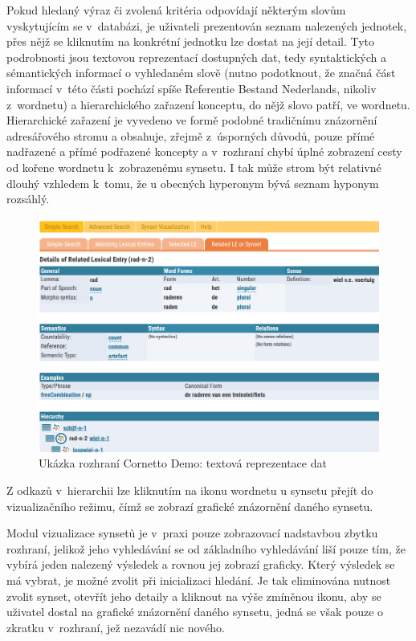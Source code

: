 \documentclass[a4paper, 11pt, oneside, showtrims]{book}
\begin{document}
					Pokud hledaný výraz či zvolená kritéria odpovídají některým slovům vyskytujícím se v~databázi, je uživateli prezentován seznam nalezených jednotek, přes nějž se kliknutím na konkrétní jednotku lze dostat na její detail. Tyto podrobnosti jsou textovou reprezentací dostupných dat, tedy syntaktických a sémantických informací o vyhledaném slově (nutno podotknout, že značná část informací v~této části pochází spíše Referentie Bestand Nederlands, nikoliv z~wordnetu) a hierarchického zařazení konceptu, do nějž slovo patří, ve wordnetu. Hierarchické zařazení je vyvedeno ve formě podobné tradičnímu znázornění adresářového stromu a obsahuje, zřejmě z~úsporných důvodů, pouze přímé nadřazené a přímé podřazené koncepty a v~rozhraní chybí úplné zobrazení cesty od kořene wordnetu k~zobrazenému synsetu. I tak může strom být relativné dlouhý vzhledem k~tomu, že u obecných hyperonym bývá seznam hyponym rozsáhlý. 

					\begin{figure}[h]
						\centering
						\includegraphics[width=1.0\textwidth]{cornetto-text1.png}
						\caption{Ukázka rozhraní Cornetto Demo: textová reprezentace dat}
						\label{fig:cornetto-text1}
					\end{figure}

					Z odkazů v~hierarchii lze kliknutím na ikonu wordnetu u synsetu přejít do vizualizačního režimu, čímž se zobrazí grafické znázornění daného synsetu. 

					Modul vizualizace synsetů je v~praxi pouze zobrazovací nadstavbou zbytku rozhraní, jelikož jeho vyhledávání se od základního vyhledávání liší pouze tím, že vybírá jeden nalezený výsledek a rovnou jej zobrazí graficky. Který výsledek se má vybrat, je možné zvolit při inicializaci hledání. Je tak eliminována nutnost zvolit synset, otevřít jeho detaily a kliknout na výše zmíněnou ikonu, aby se uživatel dostal na grafické znázornění daného synsetu, jedná se však pouze o zkratku v~rozhraní, jež nezavádí nic nového.
\end{document}
